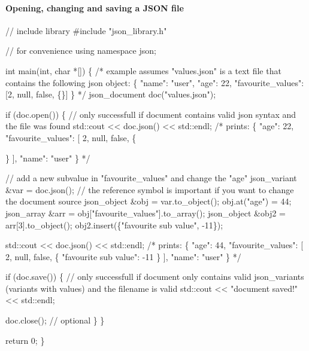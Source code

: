 \paragraph*{\label{_opening_changing_section}%
Opening, changing and saving a J\+S\+ON file}


\begin{DoxyCode}
// include library
#include "json\_library.h"

// for convenience
using namespace json;

int main(int, char *[]) \{
    /*
    example assumes "values.json" is a text file that contains the following json object:
    \{
        "name": "user",
        "age": 22,
        "favourite\_values": [2, null, false, \{\}]
    \}
    */
    json\_document doc("values.json");

    if (doc.open()) \{ // only successfull if document contains valid json syntax and the file was found
        std::cout << doc.json() << std::endl;
        /*
        prints:
        \{
            "age": 22,
            "favourite\_values": [
                2,
                null,
                false,
                \{

                \}
            ],
            "name": "user"
        \}
        */

        // add a new subvalue in "favourite\_values" and change the "age"
        json\_variant &var = doc.json();         // the reference symbol is important if you want to change
       the document source
        json\_object &obj = var.to\_object();
        obj.at("age") = 44;
        json\_array &arr = obj["favourite\_values"].to\_array();
        json\_object &obj2 = arr[3].to\_object();
        obj2.insert(\{"favourite sub value", -11\});

        std::cout << doc.json() << std::endl;
        /*
        prints:
        \{
            "age": 44,
            "favourite\_values": [
                2,
                null,
                false,
                \{
                    "favourite sub value": -11
                \}
            ],
            "name": "user"
        \}
        */

        if (doc.save()) \{ // only successfull if document only contains valid json\_variants (variants with
       values) and the filename is valid
            std::cout << "document saved!" << std::endl;

            doc.close(); // optional
        \}
    \}

    return 0;
\}
\end{DoxyCode}


